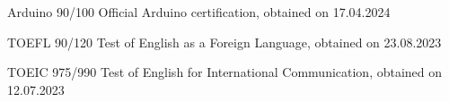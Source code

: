 
\begin{cvskills}

  \cvskill
  {Arduino 90/100}
  {Official Arduino certification, obtained on 17.04.2024}

  \cvskill
  {TOEFL 90/120}
  {Test of English as a Foreign Language, obtained on 23.08.2023}

  \cvskill
  {TOEIC 975/990}
  {Test of English for International Communication, obtained on 12.07.2023}

\end{cvskills}
